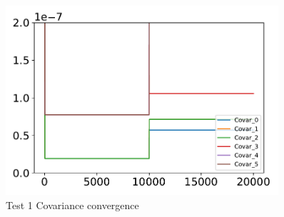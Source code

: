 \begin{figure}[htbp]\centerline{\includegraphics[width=0.9\textwidth, keepaspectratio]{AutoTeX/Test12}}\caption{Test 1 Covariance convergence}\label{fig:Test12}\end{figure}